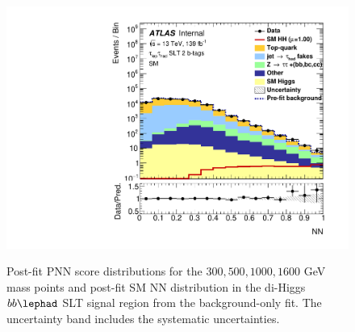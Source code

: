 \begin{figure}
   {\includegraphics[width=.45\textwidth]{figures/results/HH/LepHad/Region_BMin0_incJet1_distNN_J2_DSM_T2_SpcTauLH_Y2015_LTT0_L1_GlobalFit_conditionnal_mu0log.pdf}}\quad
\caption{Post-fit PNN score distributions for the $300, 500, 1000, 1600$ GeV mass points and post-fit SM NN distribution in the di-Higgs $bb\lephad$ SLT signal region from the \lephad background-only fit. The uncertainty band includes the systematic uncertainties.}
\label{fig:LepHadSLTPostfitPNNScoreDistributions}
\end{figure}

